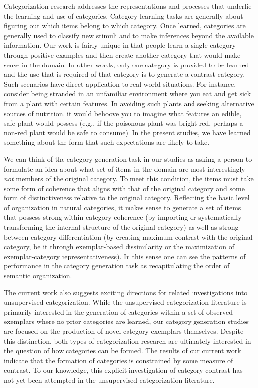 \documentclass[12pt]{article}
\begin{document}
\begin{flushleft}
Categorization research addresses the representations and processes that
underlie the learning and use of categories. Category learning tasks are
generally about figuring out which items belong to which category. Once learned,
categories are generally used to classify new stimuli and to make inferences
beyond the available information. Our work is fairly unique in that people learn
a single category through positive examples and then create another category
that would make sense in the domain. In other words, only one category is
provided to be learned and the use that is required of that category is to
generate a contrast category. Such scenarios have direct application to
real-world situations. For instance, consider being stranded in an unfamiliar
environment where you eat and get sick from a plant with certain features. In
avoiding such plants and seeking alternative sources of nutrition, it would
behoove you to imagine what features an edible, safe plant would possess (e.g.,
if the poisonous plant was bright red, perhaps a non-red plant would be safe to
consume). In the present studies, we have learned something about the form that
such expectations are likely to take. 

We can think of the category generation task in our studies as asking a person
to formulate an idea about what set of items in the domain are most
interestingly {\em not} members of the original category. To meet this
condition, the items must take some form of coherence that aligns with that of
the original category and some form of distinctiveness relative to the original
category. Reflecting the basic level of organization in natural categories, it
makes sense to generate a set of items that possess strong within-category
coherence (by importing or systematically transforming the internal structure of
the original category) as well as strong between-category differentiation (by
creating maximum contrast with the original category, be it through
exemplar-based dissimilarity or the maximization of exemplar-category
representativeness). In this sense one can see the patterns of performance in
the category generation task as recapitulating the order of semantic
organization.

The current work also suggests exciting directions for related investigations
into unsupervised categorization. While the unsupervised categorization
literature is primarily interested in the generation of categories within a set
of observed exemplars where no prior categories are learned, our category
generation studies are focused on the production of novel category exemplars
themselves. Despite this distinction, both types of categorization research are
ultimately interested in the question of how categories can be formed. The results
of our current work indicate that the formation of categories is constrained by
some measure of contrast. To our knowledge, this explicit investigation of
category contrast has not yet been attempted in the unsupervised categorization
literature. 


\end{flushleft}
\end{document}
